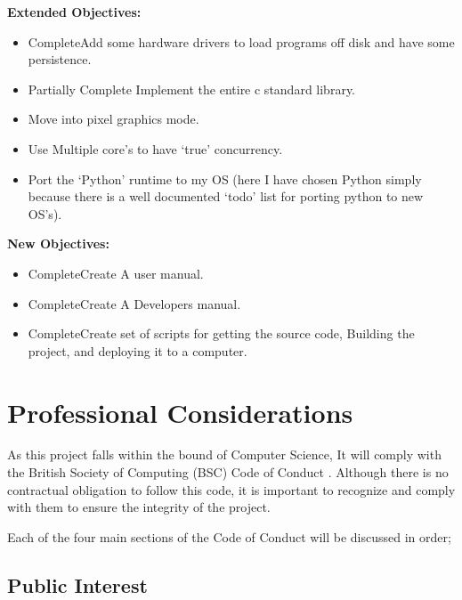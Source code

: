 \documentclass[a4paper]{report}
\begin{document}
\textbf {Extended Objectives:}


\begin{itemize}
\item \lbrack Complete\rbrack Add some hardware drivers to load programs off disk and have some persistence.
\item \lbrack Partially Complete \rbrack Implement the entire c standard library.
\item Move into pixel graphics mode.
\item Use Multiple core's to have `true' concurrency.
\item Port the `Python' runtime to my OS (here I have chosen Python simply because there is a well documented `todo' list for porting python to new OS's).
\end{itemize}

\textbf {New Objectives:}


\begin{itemize}
\item \lbrack Complete\rbrack Create A user manual.
\item \lbrack Complete\rbrack Create A Developers manual.
\item \lbrack Complete\rbrack Create set of scripts for getting the source code, Building the project, and deploying it to a computer.
\end{itemize}















\chapter{Professional Considerations}

As this project falls within the bound of Computer Science, It will comply with the British Society of Computing (BSC) Code of Conduct \cite{CoC}. Although there is no contractual obligation to follow this code, it is important to recognize and comply with them to ensure the integrity of the project.

Each of the four main sections of the Code of Conduct will be discussed in order;

\section{Public Interest}
\end{document}
